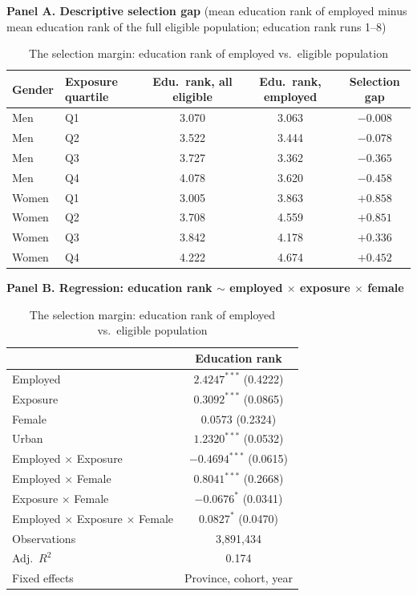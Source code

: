 \documentclass[11pt]{article}
\begin{document}
\begin{table}[htbp]
\centering
\caption{The selection margin: education rank of employed vs.\ eligible population}
\label{tab:exhibit3}
\textbf{Panel A. Descriptive selection gap} (mean education rank of employed minus mean education rank of the full eligible population; education rank runs 1--8)
\vspace{4pt}
\begin{tabular}{llccc}
\toprule
Gender & Exposure quartile & Edu.\ rank, all eligible & Edu.\ rank, employed & Selection gap \\
\midrule
Men   & Q1 & 3.070 & 3.063 & $-0.008$ \\
Men   & Q2 & 3.522 & 3.444 & $-0.078$ \\
Men   & Q3 & 3.727 & 3.362 & $-0.365$ \\
Men   & Q4 & 4.078 & 3.620 & $-0.458$ \\
\addlinespace
Women & Q1 & 3.005 & 3.863 & $+0.858$ \\
Women & Q2 & 3.708 & 4.559 & $+0.851$ \\
Women & Q3 & 3.842 & 4.178 & $+0.336$ \\
Women & Q4 & 4.222 & 4.674 & $+0.452$ \\
\bottomrule
\end{tabular}

\vspace{10pt}
\textbf{Panel B. Regression: education rank $\sim$ employed $\times$ exposure $\times$ female}
\vspace{4pt}
\begin{tabular}{lc}
\toprule
 & Education rank \\
\midrule
Employed & $2.4247^{***}$ (0.4222) \\
Exposure & $0.3092^{***}$ (0.0865) \\
Female & $0.0573$ (0.2324) \\
Urban & $1.2320^{***}$ (0.0532) \\
Employed $\times$ Exposure & $-0.4694^{***}$ (0.0615) \\
Employed $\times$ Female & $0.8041^{***}$ (0.2668) \\
Exposure $\times$ Female & $-0.0676^{*}$ (0.0341) \\
Employed $\times$ Exposure $\times$ Female & $0.0827^{*}$ (0.0470) \\
\midrule
Observations & 3,891,434 \\
Adj.\ $R^2$ & 0.174 \\
Fixed effects & Province, cohort, year \\
\bottomrule
\end{tabular}
\end{table}
\end{document}
